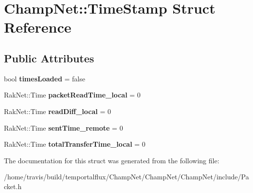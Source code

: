 \hypertarget{struct_champ_net_1_1_time_stamp}{\section{Champ\-Net\-:\-:Time\-Stamp Struct Reference}
\label{struct_champ_net_1_1_time_stamp}
}
\subsection*{Public Attributes}
\begin{DoxyCompactItemize}
\item 
\hypertarget{struct_champ_net_1_1_time_stamp_a15ed2cd3a07ef3b0b4bd58a0cbc2060c}{bool {\bfseries times\-Loaded} = false}\label{struct_champ_net_1_1_time_stamp_a15ed2cd3a07ef3b0b4bd58a0cbc2060c}

\item 
\hypertarget{struct_champ_net_1_1_time_stamp_ad2369d7af00c796be178f28ed2d14438}{Rak\-Net\-::\-Time {\bfseries packet\-Read\-Time\-\_\-local} = 0}\label{struct_champ_net_1_1_time_stamp_ad2369d7af00c796be178f28ed2d14438}

\item 
\hypertarget{struct_champ_net_1_1_time_stamp_aa2e6c532773210386df4ff9d2c5e1f2b}{Rak\-Net\-::\-Time {\bfseries read\-Diff\-\_\-local} = 0}\label{struct_champ_net_1_1_time_stamp_aa2e6c532773210386df4ff9d2c5e1f2b}

\item 
\hypertarget{struct_champ_net_1_1_time_stamp_aa99efe10e72f2c086f81e77cc6fbd337}{Rak\-Net\-::\-Time {\bfseries sent\-Time\-\_\-remote} = 0}\label{struct_champ_net_1_1_time_stamp_aa99efe10e72f2c086f81e77cc6fbd337}

\item 
\hypertarget{struct_champ_net_1_1_time_stamp_ae8466c79c649081a4027fd7ed355e9c1}{Rak\-Net\-::\-Time {\bfseries total\-Transfer\-Time\-\_\-local} = 0}\label{struct_champ_net_1_1_time_stamp_ae8466c79c649081a4027fd7ed355e9c1}

\end{DoxyCompactItemize}


The documentation for this struct was generated from the following file\-:\begin{DoxyCompactItemize}
\item 
/home/travis/build/temportalflux/\-Champ\-Net/\-Champ\-Net/\-Champ\-Net/include/Packet.\-h\end{DoxyCompactItemize}
